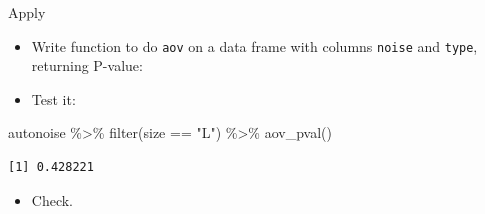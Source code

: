 \documentclass[
  ignorenonframetext,
]{beamer}
\newenvironment{Shaded}{\begin{snugshade}}{\end{snugshade}}
\newcommand{\AttributeTok}[1]{\textcolor[rgb]{0.40,0.45,0.13}{#1}}
\newcommand{\ControlFlowTok}[1]{\textcolor[rgb]{0.00,0.23,0.31}{#1}}
\newcommand{\DecValTok}[1]{\textcolor[rgb]{0.68,0.00,0.00}{#1}}
\newcommand{\FloatTok}[1]{\textcolor[rgb]{0.68,0.00,0.00}{#1}}
\newcommand{\FunctionTok}[1]{\textcolor[rgb]{0.28,0.35,0.67}{#1}}
\newcommand{\NormalTok}[1]{\textcolor[rgb]{0.00,0.23,0.31}{#1}}
\newcommand{\OtherTok}[1]{\textcolor[rgb]{0.00,0.23,0.31}{#1}}
\newcommand{\SpecialCharTok}[1]{\textcolor[rgb]{0.37,0.37,0.37}{#1}}
\newcommand{\StringTok}[1]{\textcolor[rgb]{0.13,0.47,0.30}{#1}}
\providecommand{\tightlist}{%
  \setlength{\itemsep}{0pt}\setlength{\parskip}{0pt}}\usepackage{longtable,booktabs,array}
\begin{document}
\begin{frame}[fragile]{Apply}
\protect\hypertarget{apply}{}
\begin{itemize}
\tightlist
\item
  Write function to do \texttt{aov} on a data frame with columns
  \texttt{noise} and \texttt{type}, returning P-value:
\end{itemize}

\begin{Shaded}
\end{Shaded}

\begin{itemize}
\tightlist
\item
  Test it:
\end{itemize}

\begin{Shaded}
\begin{Highlighting}[]
\NormalTok{autonoise }\SpecialCharTok{\%\textgreater{}\%}
  \FunctionTok{filter}\NormalTok{(size }\SpecialCharTok{==} \StringTok{"L"}\NormalTok{) }\SpecialCharTok{\%\textgreater{}\%}
  \FunctionTok{aov\_pval}\NormalTok{()}
\end{Highlighting}
\end{Shaded}

\begin{verbatim}
[1] 0.428221
\end{verbatim}

\begin{itemize}
\tightlist
\item
  Check.
\end{itemize}
\end{frame}
\end{document}
